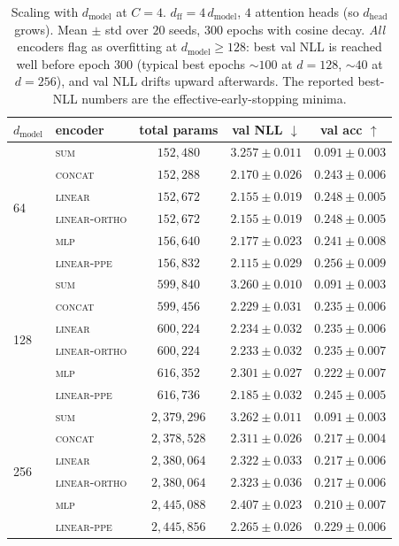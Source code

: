 \begin{table}[t]
\centering
\caption{Scaling with $d_{\text{model}}$ at $C{=}4$.
$d_{\text{ff}}{=}4\,d_{\text{model}}$, $4$ attention heads (so
$d_{\text{head}}$ grows). Mean $\pm$ std over $20$ seeds, $300$ epochs
with cosine decay. \emph{All} encoders flag as overfitting at
$d_{\text{model}} \ge 128$: best val NLL is reached well before epoch
$300$ (typical best epochs $\sim$$100$ at $d{=}128$, $\sim$$40$ at
$d{=}256$), and val NLL drifts upward afterwards. The reported
best-NLL numbers are the effective-early-stopping minima.}
\label{tab:dmodel}
\begin{tabular}{llccc}
\toprule
$d_{\text{model}}$ & encoder & total params & val NLL $\downarrow$ & val acc $\uparrow$ \\
\midrule
\multirow{6}{*}{64}
    & \textsc{sum}        & $152{,}480$    & $3.257 \pm 0.011$ & $0.091 \pm 0.003$ \\
    & \textsc{concat}     & $152{,}288$    & $2.170 \pm 0.026$ & $0.243 \pm 0.006$ \\
    & \textsc{linear}     & $152{,}672$    & $2.155 \pm 0.019$ & $0.248 \pm 0.005$ \\
    & \textsc{linear-ortho}  & $152{,}672$    & $2.155 \pm 0.019$ & $0.248 \pm 0.005$ \\
    & \textsc{mlp}        & $156{,}640$    & $2.177 \pm 0.023$ & $0.241 \pm 0.008$ \\
    & \textsc{linear-ppe} & $156{,}832$    & $2.115 \pm 0.029$ & $0.256 \pm 0.009$ \\
\midrule
\multirow{6}{*}{128}
    & \textsc{sum}        & $599{,}840$    & $3.260 \pm 0.010$ & $0.091 \pm 0.003$ \\
    & \textsc{concat}     & $599{,}456$    & $2.229 \pm 0.031$ & $0.235 \pm 0.006$ \\
    & \textsc{linear}     & $600{,}224$    & $2.234 \pm 0.032$ & $0.235 \pm 0.006$ \\
    & \textsc{linear-ortho}  & $600{,}224$    & $2.233 \pm 0.032$ & $0.235 \pm 0.007$ \\
    & \textsc{mlp}        & $616{,}352$    & $2.301 \pm 0.027$ & $0.222 \pm 0.007$ \\
    & \textsc{linear-ppe} & $616{,}736$    & $2.185 \pm 0.032$ & $0.245 \pm 0.005$ \\
\midrule
\multirow{6}{*}{256}
    & \textsc{sum}        & $2{,}379{,}296$ & $3.262 \pm 0.011$ & $0.091 \pm 0.003$ \\
    & \textsc{concat}     & $2{,}378{,}528$ & $2.311 \pm 0.026$ & $0.217 \pm 0.004$ \\
    & \textsc{linear}     & $2{,}380{,}064$ & $2.322 \pm 0.033$ & $0.217 \pm 0.006$ \\
    & \textsc{linear-ortho}  & $2{,}380{,}064$ & $2.323 \pm 0.036$ & $0.217 \pm 0.006$ \\
    & \textsc{mlp}        & $2{,}445{,}088$ & $2.407 \pm 0.023$ & $0.210 \pm 0.007$ \\
    & \textsc{linear-ppe} & $2{,}445{,}856$ & $2.265 \pm 0.026$ & $0.229 \pm 0.006$ \\
\bottomrule
\end{tabular}
\end{table}

